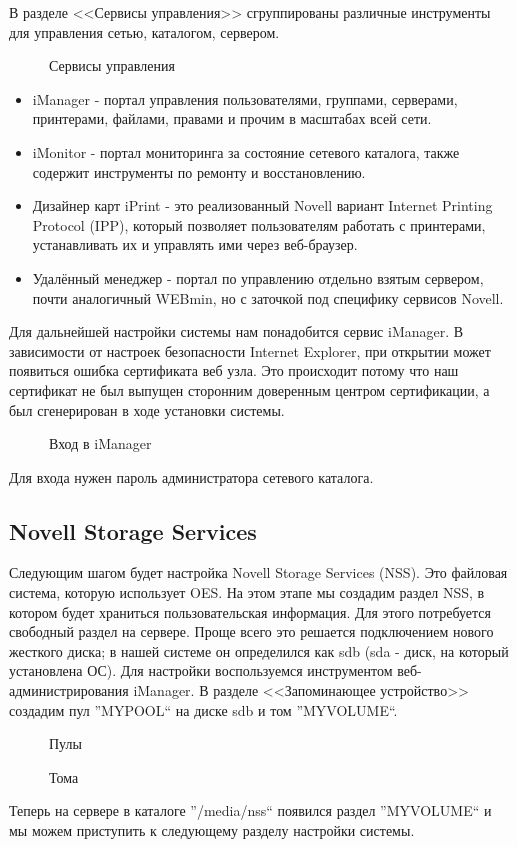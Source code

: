 В разделе <<Сервисы управления>> сгруппированы различные инструменты для управления сетью, каталогом, сервером.
\begin{figure}[H]
\caption{Сервисы управления}
\end{figure}
\begin{itemize}
\item iManager - портал управления пользователями, группами, серверами, принтерами, файлами, правами и прочим в масштабах всей сети.
\item iMonitor - портал мониторинга за состояние сетевого каталога, также содержит инструменты по ремонту и восстановлению.
\item Дизайнер карт iPrint - это реализованный Novell вариант Internet Printing Protocol (IPP), который позволяет пользователям работать с принтерами, устанавливать их и управлять ими через веб-браузер.
\item Удалённый менеджер - портал по управлению отдельно взятым сервером, почти аналогичный WEBmin, но с заточкой под специфику сервисов Novell.
\end{itemize}
\clearpage

Для дальнейшей настройки системы нам понадобится сервис \foreignlanguage{english}{iManager}. В зависимости от настроек безопасности \foreignlanguage{english}{Internet Explorer}, при открытии может появиться ошибка сертификата веб узла. Это происходит потому что наш сертификат не был выпущен  сторонним доверенным центром сертификации, а был сгенерирован в ходе установки системы. 
\begin{figure}[H]
\caption{Вход в iManager}
\end{figure}
Для входа нужен пароль администратора сетевого каталога.
\clearpage

\subsection{Novell Storage Services}
Следующим шагом будет настройка Novell Storage Services (NSS). Это файловая система, которую использует OES. На этом этапе мы создадим раздел NSS, в котором будет храниться пользовательская информация. Для этого потребуется свободный раздел на сервере. Проще всего это решается подключением нового жесткого диска; в нашей системе он определился как sdb (sda - диск, на который установлена ОС). Для настройки воспользуемся инструментом веб-администрирования iManager. В разделе <<Запоминающее устройство>> создадим пул ''MYPOOL`` на диске sdb и том ''MYVOLUME``. 
\begin{figure}[H]
\caption{Пулы}
\end{figure}
\begin{figure}[H]
\caption{Тома}
\end{figure}
Теперь на сервере в каталоге ''/media/nss`` появился раздел ''MYVOLUME`` и мы можем приступить к следующему разделу настройки системы.
\clearpage

